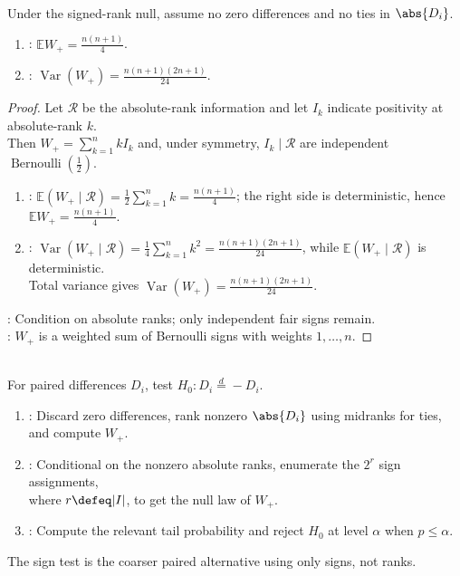 \begin{theorem} \label{thm:signed-rank-mean-variance} \\
Under the signed-rank null, assume no zero differences and no ties in $\abs{D_i}$.
\begin{enumerate}[label=(\roman*)]
\setlength{\itemsep}{0pt}
\item {}: $\mathbb{E}W_+=\frac{n(n+1)}{4}$.
\item {}: $\operatorname{Var}(W_+)=\frac{n(n+1)(2n+1)}{24}$.
\end{enumerate}
\begin{proof}
Let $\mathcal{R}$ be the absolute-rank information and let $I_k$ indicate positivity at absolute-rank $k$.\\
Then $W_+=\sum\limits_{k=1}^nkI_k$ and, under symmetry, $I_k\mid\mathcal{R}$ are independent $\operatorname{Bernoulli}(\frac{1}{2})$.
\begin{enumerate}[label=(\roman*)]
\setlength{\itemsep}{0pt}
\item {}: $\mathbb{E}(W_+\mid\mathcal{R})=\frac{1}{2}\sum\limits_{k=1}^nk=\frac{n(n+1)}{4}$; the right side is deterministic, hence $\mathbb{E}W_+=\frac{n(n+1)}{4}$.
\item {}: $\operatorname{Var}(W_+\mid\mathcal{R})=\frac{1}{4}\sum\limits_{k=1}^nk^2=\frac{n(n+1)(2n+1)}{24}$, while $\mathbb{E}(W_+\mid\mathcal{R})$ is deterministic.\\
Total variance gives $\operatorname{Var}(W_+)=\frac{n(n+1)(2n+1)}{24}$.
\end{enumerate}
: Condition on absolute ranks; only independent fair signs remain.\\
: $W_+$ is a weighted sum of Bernoulli signs with weights $1,\ldots,n$.
\end{proof}
\end{theorem}

\begin{method} \label{meth:signed-rank-test} \\
For paired differences $D_i$, test $H_0:D_i\stackrel{d}{=}-D_i$.
\begin{enumerate}[label=(\roman*)]
\setlength{\itemsep}{0pt}
\item {}: Discard zero differences, rank nonzero $\abs{D_i}$ using midranks for ties, and compute $W_+$.
\item {}: Conditional on the nonzero absolute ranks, enumerate the $2^r$ sign assignments,\\
where $r\defeq|I|$, to get the null law of $W_+$.
\item {}: Compute the relevant tail probability and reject $H_0$ at level $\alpha$ when $p\leq\alpha$.
\end{enumerate}
The sign test is the coarser paired alternative using only signs, not ranks.
\end{method}

